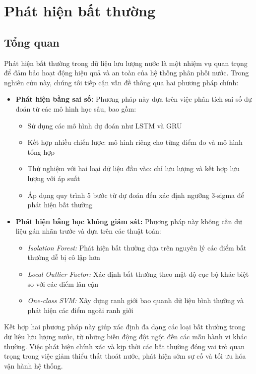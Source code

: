 \section{Phát hiện bất thường}
\subsection{Tổng quan}
Phát hiện bất thường trong dữ liệu lưu lượng nước là một nhiệm vụ quan trọng để đảm bảo hoạt động hiệu quả và an toàn của hệ thống phân phối nước. Trong nghiên cứu này, chúng tôi tiếp cận vấn đề thông qua hai phương pháp chính:

\begin{itemize}
    \item \textbf{Phát hiện bằng sai số:} Phương pháp này dựa trên việc phân tích sai số dự đoán từ các mô hình học sâu, bao gồm:
    \begin{itemize}
        \item Sử dụng các mô hình dự đoán như LSTM và GRU
        \item Kết hợp nhiều chiến lược: mô hình riêng cho từng điểm đo và mô hình tổng hợp
        \item Thử nghiệm với hai loại dữ liệu đầu vào: chỉ lưu lượng và kết hợp lưu lượng với áp suất
        \item Áp dụng quy trình 5 bước từ dự đoán đến xác định ngưỡng 3-sigma để phát hiện bất thường
    \end{itemize}
    
    \item \textbf{Phát hiện bằng học không giám sát:} Phương pháp này không cần dữ liệu gán nhãn trước và dựa trên các thuật toán:
    \begin{itemize}
        \item \textit{Isolation Forest:} Phát hiện bất thường dựa trên nguyên lý các điểm bất thường dễ bị cô lập hơn
        \item \textit{Local Outlier Factor:} Xác định bất thường theo mật độ cục bộ khác biệt so với các điểm lân cận
        \item \textit{One-class SVM:} Xây dựng ranh giới bao quanh dữ liệu bình thường và phát hiện các điểm ngoài ranh giới
    \end{itemize}
\end{itemize}

Kết hợp hai phương pháp này giúp xác định đa dạng các loại bất thường trong dữ liệu lưu lượng nước, từ những biến động đột ngột đến các mẫu hành vi khác thường. Việc phát hiện chính xác và kịp thời các bất thường đóng vai trò quan trọng trong việc giảm thiểu thất thoát nước, phát hiện sớm sự cố và tối ưu hóa vận hành hệ thống.

